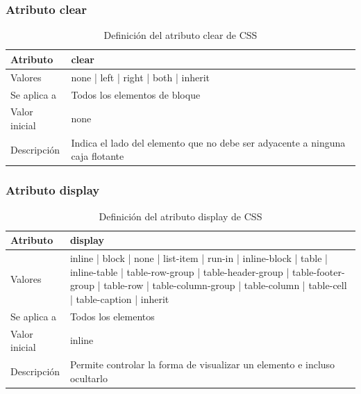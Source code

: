 \documentclass[ucs]{beamer}
\begin{document}

\begin{frame}
\frametitle{Atributo clear}

\begin{center}
  \begin{table}
   \begin{tabular}{p{1.8cm}p{7.8cm}}
Atributo & \bf{clear} \\ \hline
Valores& none | left | right | both | inherit \\ \hline
Se aplica a& Todos los elementos de bloque \\ \hline
Valor inicial& none \\ \hline
Descripción& Indica el lado del elemento que no debe ser adyacente a ninguna caja flotante \\ \hline
  \end{tabular}
   \caption{Definición del atributo clear de CSS}
 \end{table}
\end{center}


\end{frame}




\begin{frame}
\frametitle{Atributo display}

\begin{center}
  \begin{table}
   \begin{tabular}{p{1.8cm}p{7.8cm}}
Atributo & \bf{display} \\ \hline
Valores& inline | block | none | list-item | run-in | inline-block | table | inline-table | table-row-group | table-header-group | table-footer-group | table-row | table-column-group | table-column | table-cell | table-caption | inherit \\ \hline
Se aplica a& Todos los elementos \\ \hline
Valor inicial& inline \\ \hline
Descripción& Permite controlar la forma de visualizar un elemento e incluso ocultarlo \\ \hline
  \end{tabular}
   \caption{Definición del atributo display de CSS}
 \end{table}
\end{center}


\end{frame}
\end{document}
